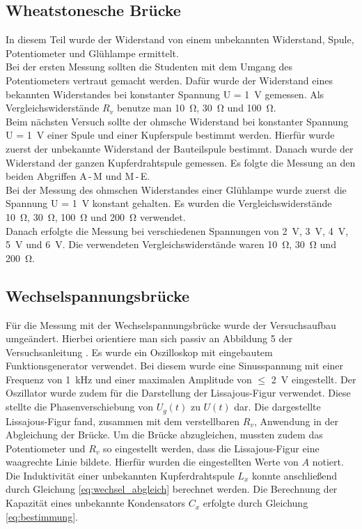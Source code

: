 \documentclass[a4paper,usenatbib]{aspdoc}
\begin{document}
        \subsection{Wheatstonesche Brücke}\label{subsec:experiment_wheatstone}
            In diesem Teil wurde der Widerstand von einem unbekannten Widerstand, Spule, Potentiometer und Glühlampe ermittelt.\\
            Bei der ersten Messung sollten die Studenten mit dem Umgang des Potentiometers vertraut gemacht werden. Dafür wurde der Widerstand eines bekannten Widerstandes bei konstanter Spannung U = \SI{1}{\volt} gemessen. Als Vergleichswiderstände $R_v$ benutze man \SI{10}{\ohm}, \SI{30}{\ohm} und \SI{100}{\ohm}.\\
            Beim nächsten Versuch sollte der ohmsche Widerstand bei konstanter Spannung U = \SI{1}{\volt} einer Spule und einer Kupferspule bestimmt werden. Hierfür wurde zuerst der unbekannte Widerstand der Bauteilspule bestimmt. Danach wurde der Widerstand der ganzen Kupferdrahtspule gemessen. Es folgte die Messung an den beiden Abgriffen A\,-\,M und M\,-\,E.\\
            Bei der Messung des ohmschen Widerstandes einer Glühlampe wurde zuerst die Spannung U = \SI{1}{\volt} konstant gehalten. Es wurden die Vergleichswiderstände \SI{10}{\ohm}, \SI{30}{\ohm}, \SI{100}{\ohm} und \SI{200}{\ohm} verwendet.\\
            Danach erfolgte die Messung bei verschiedenen Spannungen von \SI{2}{\volt}, \SI{3}{\volt}, \SI{4}{\volt}, \SI{5}{\volt} und \SI{6}{\volt}. Die verwendeten Vergleichswiderstände waren \SI{10}{\ohm}, \SI{30}{\ohm} und \SI{200}{\ohm}.
            
                
        \subsection{Wechselspannungsbrücke}\label{subsec:experiment_wechsel}
            Für die Messung mit der Wechselspannungsbrücke wurde der Versuchsaufbau umgeändert. Hierbei orientiere man sich passiv an Abbildung 5 der Versuchsanleitung \cite{anleitung}. Es wurde ein Oszilloskop mit eingebautem Funktionsgenerator verwendet. Bei diesem wurde eine Sinusspannung mit einer Frequenz von \SI{1}{\kilo\hertz} und einer maximalen Amplitude von $\leq$ \SI{2}{\volt} eingestellt. Der Oszillator wurde zudem für die Darstellung der Lissajous-Figur verwendet. Diese stellte die Phasenverschiebung von $U_g(t)$ zu $U(t)$ dar. Die dargestellte Lissajous-Figur fand, zusammen mit dem verstellbaren $R_v$, Anwendung in der Abgleichung der Brücke. Um die Brücke abzugleichen, mussten zudem das Potentiometer und $R_v$ so eingestellt werden, dass die Lissajous-Figur eine waagrechte Linie bildete. Hierfür wurden die eingestellten Werte von $A$ notiert. Die Induktivität einer unbekannten Kupferdrahtspule $L_x$ konnte anschließend durch Gleichung \ref{eq:wechsel_abgleich} berechnet werden. Die Berechnung der Kapazität eines unbekannte Kondensators $C_x$ erfolgte durch Gleichung \ref{eq:bestimmung}.
       
\end{document}
